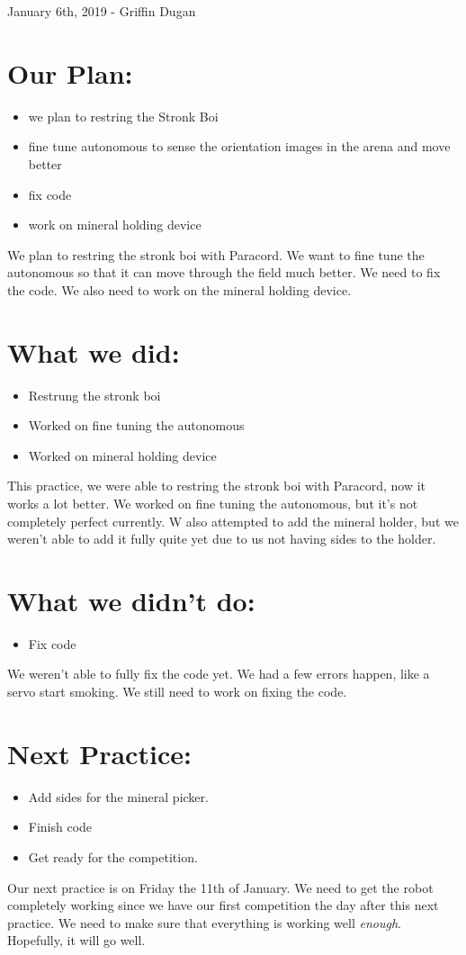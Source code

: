 \documentclass[12pt]{article}
\begin{document}
January 6th, 2019 - Griffin Dugan

\section{Our Plan:}
\begin{itemize}
	\item we plan to restring the Stronk Boi
	\item fine tune autonomous to sense the orientation images in the arena and move better
	\item fix code
	\item work on mineral holding device
\end{itemize}

We plan to restring the stronk boi with Paracord. We want to fine tune the autonomous so that it can move through the field much better. We need to fix the code. We also need to work on the mineral holding device.

\section{What we did:}
\begin{itemize}
	\item Restrung the stronk boi
	\item Worked on fine tuning the autonomous
	\item Worked on mineral holding device
\end{itemize}

This practice, we were able to restring the stronk boi with Paracord, now it works a lot better. We worked on fine tuning the autonomous, but it's not completely perfect currently. W also attempted to add the mineral holder, but we weren't able to add it fully quite yet due to us not having sides to the holder.

\section{What we didn't do:}
\begin{itemize}
	\item Fix code
\end{itemize}

We weren't able to fully fix the code yet. We had a few errors happen, like a servo start smoking. We still need to work on fixing the code.

\section{Next Practice:}
\begin{itemize}
	\item Add sides for the mineral picker.
	\item Finish code
	\item Get ready for the competition.
\end{itemize}

Our next practice is on Friday the 11th of January. We need to get the robot completely working since we have our first competition the day after this next practice. We need to make sure that everything is working well \textit{enough}. Hopefully, it will go well.
\end{document}
